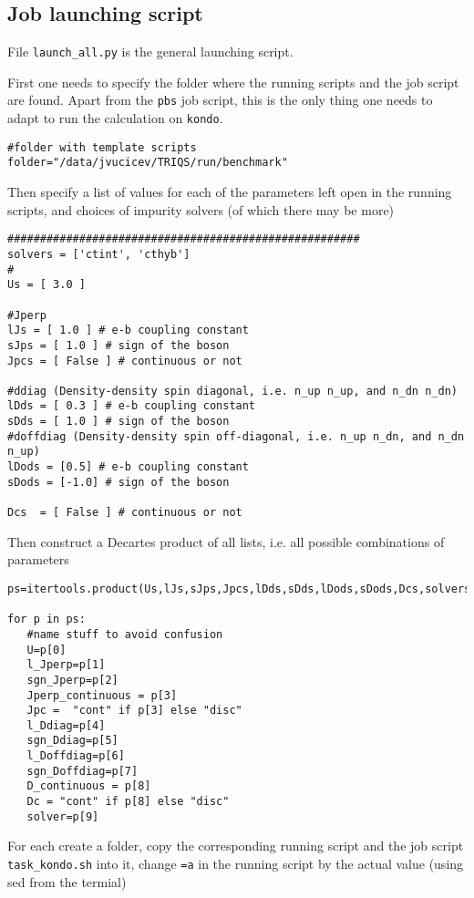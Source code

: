\documentclass[a4paper,10pt]{article}
\begin{document}
\subsection{Job launching script}
File {\tt launch\_all.py} is the general launching script.

First one needs to specify the folder where the running scripts and the job script are found. Apart from the {\tt pbs} job script, this is the only thing one needs to adapt to run the calculation on {\tt kondo}.
\begin{lstlisting}
#folder with template scripts
folder="/data/jvucicev/TRIQS/run/benchmark"
\end{lstlisting}
Then specify a list of values for each of the parameters left open in the running scripts, and choices of impurity solvers (of which there may be more)
\begin{lstlisting}
######################################################
solvers = ['ctint', 'cthyb']
#
Us = [ 3.0 ]

#Jperp
lJs = [ 1.0 ] # e-b coupling constant
sJps = [ 1.0 ] # sign of the boson
Jpcs = [ False ] # continuous or not

#ddiag (Density-density spin diagonal, i.e. n_up n_up, and n_dn n_dn)
lDds = [ 0.3 ] # e-b coupling constant
sDds = [ 1.0 ] # sign of the boson
#doffdiag (Density-density spin off-diagonal, i.e. n_up n_dn, and n_dn n_up)
lDods = [0.5] # e-b coupling constant
sDods = [-1.0] # sign of the boson

Dcs  = [ False ] # continuous or not
\end{lstlisting}
Then construct a Decartes product of all lists, i.e. all possible combinations of parameters
\begin{lstlisting}
ps=itertools.product(Us,lJs,sJps,Jpcs,lDds,sDds,lDods,sDods,Dcs,solvers)

for p in ps:    
   #name stuff to avoid confusion   
   U=p[0]
   l_Jperp=p[1]
   sgn_Jperp=p[2]
   Jperp_continuous = p[3] 
   Jpc =  "cont" if p[3] else "disc"
   l_Ddiag=p[4]
   sgn_Ddiag=p[5]
   l_Doffdiag=p[6]
   sgn_Doffdiag=p[7]
   D_continuous = p[8] 
   Dc = "cont" if p[8] else "disc"
   solver=p[9]
\end{lstlisting}   
For each create a folder, copy the corresponding running script and the job script {\tt task\_kondo.sh} into it, change {\tt =a} in the running script by the actual value (using sed from the termial)
\end{document}
